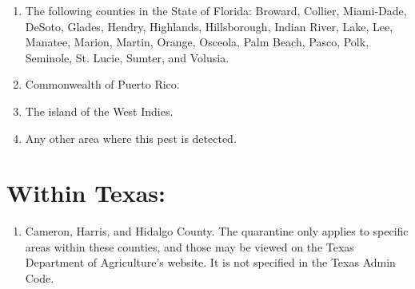 \documentclass[12pt]{exam}
\begin{document}
\begin{enumerate}
\item The following counties in the State of Florida: Broward, Collier, Miami-Dade, DeSoto, Glades, Hendry, Highlands, Hillsborough, Indian River, Lake, Lee, Manatee, Marion, Martin, Orange, Osceola, Palm Beach, Pasco, Polk, Seminole, St. Lucie, Sumter, and Volusia.
\item Commonwealth of Puerto Rico.
\item The island of the West Indies.
\item Any other area where this pest is detected.
\end{enumerate}

\section{Within Texas:}
\begin{enumerate}
\item Cameron, Harris, and Hidalgo County. The quarantine only applies to specific areas within these counties, and those may be viewed on the Texas Department of Agriculture's website. It is not specified in the Texas Admin Code.
\end{enumerate}
\newpage
\end{document}
